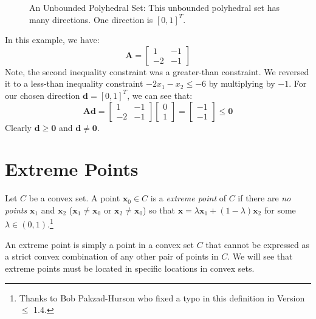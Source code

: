 \begin{example}
\begin{figure}[htbp]
\caption{An Unbounded Polyhedral Set: This unbounded polyhedral set has many directions. One direction is $[0,1]^T$.}
\label{fig:UnboundedPolyhedron}
\end{figure}
In this example, we have:
\begin{equation}
\mathbf{A} = \begin{bmatrix}
1 & -1\\
-2 & -1
\end{bmatrix}
\end{equation}
Note, the second inequality constraint was a greater-than constraint. We reversed it to a less-than inequality constraint $-2x_1 - x_2 \leq -6$ by multiplying by $-1$. For our chosen direction $\mathbf{d} = [0,1]^T$, we can see that:
\begin{equation}
\mathbf{A}\mathbf{d} = 
\begin{bmatrix}
1 & -1\\
-2 & -1
\end{bmatrix}
\begin{bmatrix}
0\\
1
\end{bmatrix} = 
\begin{bmatrix}
-1\\
-1
\end{bmatrix} \leq \mathbf{0}
\end{equation}
Clearly $\mathbf{d} \geq \mathbf{0}$ and $\mathbf{d} \neq \mathbf{0}$.
\label{ex:UnboundedPolyhedron}
\end{example}

\section{Extreme Points}
\begin{definition} Let $C$ be a convex set. A point $\mathbf{x}_0 \in C$ is a \textit{extreme point} of $C$ if there are \textit{no points} $\mathbf{x}_1$ and $\mathbf{x}_2$ ($\mathbf{x}_1 \neq \mathbf{x}_0$ or $\mathbf{x}_2 \neq \mathbf{x}_0$) so that
$\mathbf{x} = \lambda\mathbf{x}_1 + (1-\lambda)\mathbf{x}_2$ for some $\lambda \in (0,1)$.\footnote{Thanks to Bob Pakzad-Hurson who fixed a typo in this definition in Version $\leq$ 1.4.}
\label{defn:ExtremePoint}
\end{definition}

An extreme point is simply a point in a convex set $C$ that cannot be expressed as a strict convex combination of any other pair of points in $C$. We will see that extreme points must be located in specific locations in convex sets. 

